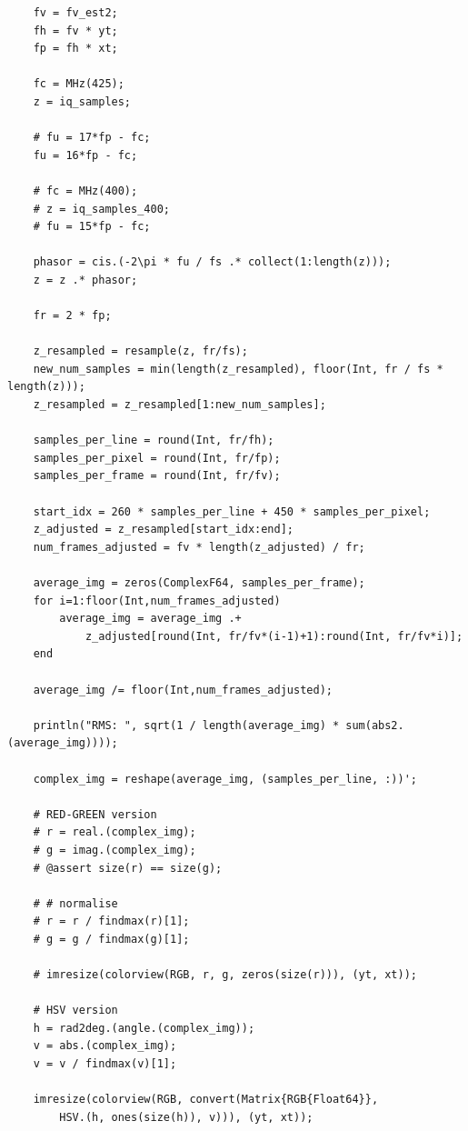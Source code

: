 \documentclass{article}
\begin{document}
\begin{verbatim}
    fv = fv_est2;
    fh = fv * yt;
    fp = fh * xt;

    fc = MHz(425);
    z = iq_samples;

    # fu = 17*fp - fc;
    fu = 16*fp - fc;

    # fc = MHz(400);
    # z = iq_samples_400;
    # fu = 15*fp - fc;

    phasor = cis.(-2\pi * fu / fs .* collect(1:length(z)));
    z = z .* phasor;

    fr = 2 * fp;

    z_resampled = resample(z, fr/fs);
    new_num_samples = min(length(z_resampled), floor(Int, fr / fs * length(z)));
    z_resampled = z_resampled[1:new_num_samples];

    samples_per_line = round(Int, fr/fh);
    samples_per_pixel = round(Int, fr/fp);
    samples_per_frame = round(Int, fr/fv);

    start_idx = 260 * samples_per_line + 450 * samples_per_pixel;
    z_adjusted = z_resampled[start_idx:end];
    num_frames_adjusted = fv * length(z_adjusted) / fr;

    average_img = zeros(ComplexF64, samples_per_frame);
    for i=1:floor(Int,num_frames_adjusted)
        average_img = average_img .+
            z_adjusted[round(Int, fr/fv*(i-1)+1):round(Int, fr/fv*i)];
    end

    average_img /= floor(Int,num_frames_adjusted);

    println("RMS: ", sqrt(1 / length(average_img) * sum(abs2.(average_img))));

    complex_img = reshape(average_img, (samples_per_line, :))';

    # RED-GREEN version
    # r = real.(complex_img);
    # g = imag.(complex_img);
    # @assert size(r) == size(g);

    # # normalise
    # r = r / findmax(r)[1];
    # g = g / findmax(g)[1];

    # imresize(colorview(RGB, r, g, zeros(size(r))), (yt, xt));

    # HSV version
    h = rad2deg.(angle.(complex_img));
    v = abs.(complex_img);
    v = v / findmax(v)[1];

    imresize(colorview(RGB, convert(Matrix{RGB{Float64}},
        HSV.(h, ones(size(h)), v))), (yt, xt));
\end{verbatim}
\end{document}
